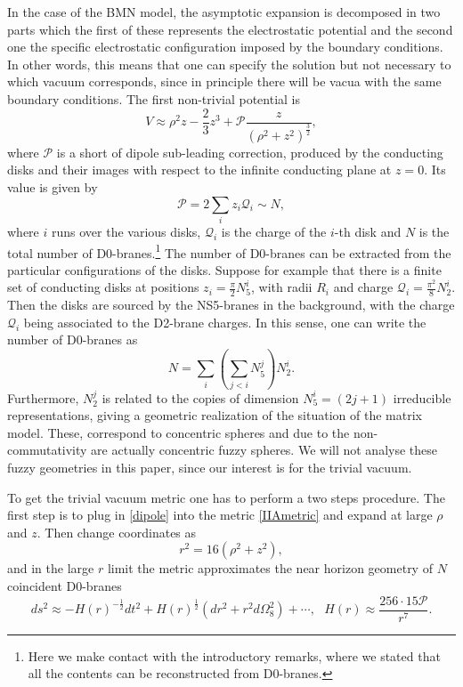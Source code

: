 \documentclass[11pt,english]{article}
\newcommand{\be}{\begin{equation}}
\newcommand{\ee}{\end{equation}}
\numberwithin{equation}{section}
\begin{document}
In the case of the BMN model, the asymptotic expansion is decomposed in two parts which the first of these represents the electrostatic potential and the second one the specific electrostatic configuration imposed by the boundary conditions. In other words, this means that one can specify the solution but not necessary to which vacuum corresponds, since in principle there will be vacua with the same boundary conditions. The first non-trivial potential is \cite{Maldacena2003}
\be \label{dipole}
V\approx \rho^2 z-\frac{2}{3}z^3+\mathcal{P}\frac{z}{\left(\rho^2+z^2\right)^\frac{3}{2}},
\ee
where $\mathcal{P}$ is a short of dipole sub-leading correction, produced by the conducting disks and their images with respect to the infinite conducting plane at $z=0$. Its value is given by 
\be 
\mathcal{P}=2\sum_iz_i\mathcal{Q}_i\sim N,
\ee
where $i$ runs over the various disks, $\mathcal{Q}_i$ is the charge of the $i$-th disk and $N$ is the total number of D0-branes.\footnote{Here we make contact with the introductory remarks, where we stated that all the contents can be reconstructed from D0-branes.} The number of D0-branes can be extracted from the particular configurations of the disks. Suppose for example that there is a finite set of conducting disks at positions $z_i=\frac{\pi}{2}N_5^{i}$, with radii $R_i$ and charge $\mathcal{Q}_i=\frac{\pi^2}{8}N_2^{i}$. Then the disks are sourced by the NS5-branes in the background, with the charge $\mathcal{Q}_i$ being associated to the D2-brane charges. In this sense, one can write the number of D0-branes as 
\be 
N=\sum_{i}\left(\sum_{j<i}N_5^{j}\right)N_2^{i}.
\ee    
Furthermore,  $N_2^{j}$ is related to the copies of dimension $N_5^{i}=(2j+1)$ irreducible representations, giving a geometric realization of the situation of the matrix model.
These, correspond to concentric spheres and due to the non-commutativity are actually concentric  fuzzy spheres. We will not analyse these fuzzy geometries in this paper, since our interest is for the trivial vacuum.

\noindent
To get the trivial vacuum metric one has to perform a two steps procedure. The first step is to plug in  \eqref{dipole} into the metric \eqref{IIAmetric} and expand at large $\rho$ and $z$. Then change coordinates  as
\be \label{coordchange}
r^2=16\left(\rho^2+z^2\right),
\ee
 and in the large $r$ limit the metric approximates the near horizon geometry of $N$ coincident D0-branes \cite{Lin2006}
\be \label{larger}
ds^2\approx -H(r)^{-\frac{1}{2}}dt^2+H(r)^{\frac{1}{2}}\left(dr^2+r^2d\Omega_8^2\right)+\cdots,~~~H(r)\approx \frac{256\cdot 15\mathcal{P}}{r^7}.
\ee
\end{document}
